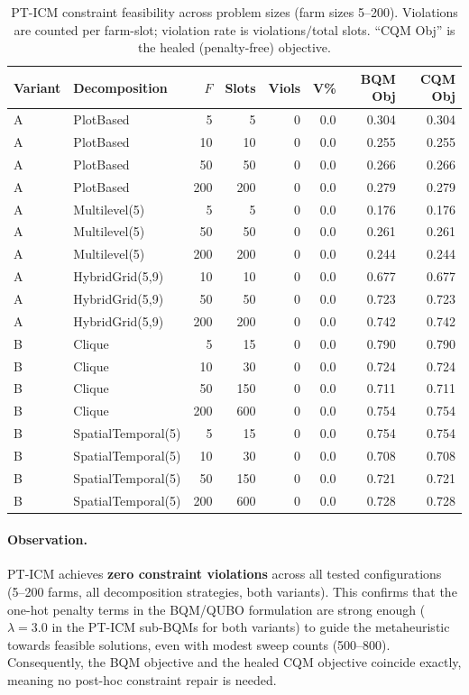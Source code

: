 \documentclass[11pt,a4paper]{article}
\begin{document}
\begin{table}[H]
\centering
\caption{PT-ICM constraint feasibility across problem sizes (farm sizes 5--200).
  Violations are counted per farm-slot; violation rate is violations$/$total slots.
  ``CQM Obj'' is the healed (penalty-free) objective.}
\label{tab:violations}
\begin{tabular}{llrrrrrr}
\toprule
\textbf{Variant} & \textbf{Decomposition} & $F$ & \textbf{Slots} & \textbf{Viols} & \textbf{V\%} & \textbf{BQM Obj} & \textbf{CQM Obj} \\
\midrule
A & PlotBased         &   5 &   5 & 0 & 0.0 & 0.304 & 0.304 \\
A & PlotBased         &  10 &  10 & 0 & 0.0 & 0.255 & 0.255 \\
A & PlotBased         &  50 &  50 & 0 & 0.0 & 0.266 & 0.266 \\
A & PlotBased         & 200 & 200 & 0 & 0.0 & 0.279 & 0.279 \\
A & Multilevel(5)     &   5 &   5 & 0 & 0.0 & 0.176 & 0.176 \\
A & Multilevel(5)     &  50 &  50 & 0 & 0.0 & 0.261 & 0.261 \\
A & Multilevel(5)     & 200 & 200 & 0 & 0.0 & 0.244 & 0.244 \\
A & HybridGrid(5,9)   &  10 &  10 & 0 & 0.0 & 0.677 & 0.677 \\
A & HybridGrid(5,9)   &  50 &  50 & 0 & 0.0 & 0.723 & 0.723 \\
A & HybridGrid(5,9)   & 200 & 200 & 0 & 0.0 & 0.742 & 0.742 \\
\midrule
B & Clique            &   5 &  15 & 0 & 0.0 & 0.790 & 0.790 \\
B & Clique            &  10 &  30 & 0 & 0.0 & 0.724 & 0.724 \\
B & Clique            &  50 & 150 & 0 & 0.0 & 0.711 & 0.711 \\
B & Clique            & 200 & 600 & 0 & 0.0 & 0.754 & 0.754 \\
B & SpatialTemporal(5) &  5 &  15 & 0 & 0.0 & 0.754 & 0.754 \\
B & SpatialTemporal(5) & 10 &  30 & 0 & 0.0 & 0.708 & 0.708 \\
B & SpatialTemporal(5) & 50 & 150 & 0 & 0.0 & 0.721 & 0.721 \\
B & SpatialTemporal(5) &200 & 600 & 0 & 0.0 & 0.728 & 0.728 \\
\bottomrule
\end{tabular}
\end{table}

\paragraph{Observation.}
PT-ICM achieves \textbf{zero constraint violations} across all tested configurations
(5--200 farms, all decomposition strategies, both variants).  This confirms that
the one-hot penalty terms in the BQM/QUBO formulation are strong enough
($\lambda = 3.0$ in the PT-ICM sub-BQMs for both variants) to guide the
metaheuristic towards feasible solutions, even with modest sweep counts (500--800).
Consequently, the BQM objective and the healed CQM objective coincide exactly,
meaning no post-hoc constraint repair is needed.
\end{document}
